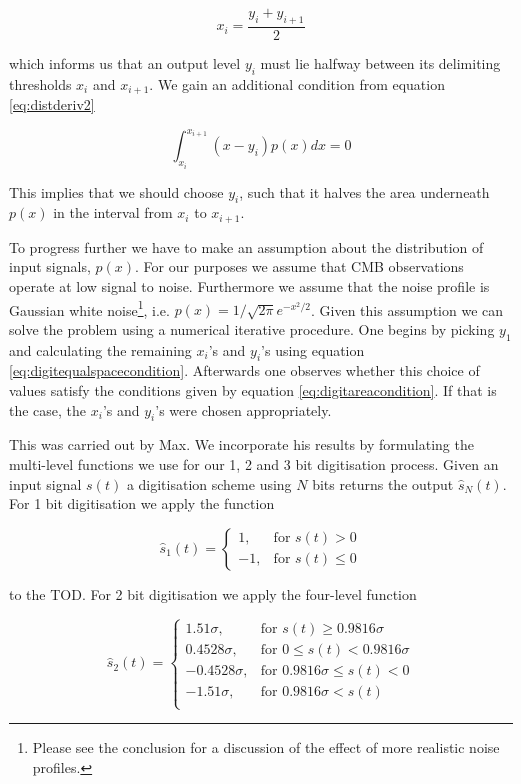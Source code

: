 \documentclass[apj]{emulateapj}
\begin{document}
\begin{equation} \label{eq:digitequalspacecondition}
x_i = \frac{y_i+y_{i+1}}{2}
\end{equation}

which informs us that an output level $y_i$ must lie halfway between its delimiting thresholds $x_i$ and $x_{i+1}$. We gain an additional condition from equation \ref{eq:distderiv2}

\begin{equation} \label{eq:digitareacondition}
\int_{x_i}^{x_{i+1}} \left( x-y_i \right) p(x) dx = 0
\end{equation}

This implies that we should choose $y_i$, such that it halves the area underneath $p(x)$ in the interval from $x_i$ to $x_{i+1}$.

To progress further we have to make an assumption about the distribution of input signals, $p(x)$. For our purposes we assume that CMB observations operate at low signal to noise. Furthermore we assume that the noise profile is Gaussian white noise\footnote{Please see the conclusion for a discussion of the effect of more realistic noise profiles.}, i.e. $p(x) = 1/\sqrt{2\pi} e^{-x^2/2}$. Given this assumption we can solve the problem using a numerical iterative procedure. One begins by picking $y_1$ and calculating the remaining $x_i$'s and $y_i$'s using equation \ref{eq:digitequalspacecondition}. Afterwards one observes whether this choice of values satisfy the conditions given by equation \ref{eq:digitareacondition}. If that is the case, the $x_i$'s and $y_i$'s were chosen appropriately.

This was carried out by Max. We incorporate his results by formulating the multi-level functions we use for our 1, 2 and 3 bit digitisation process. Given an input signal $s(t)$ a digitisation scheme using $N$ bits returns the output $\hat{s}_N(t)$. For 1 bit digitisation we apply the function

\[ \hat{s}_1(t) = \left\{ \begin{array}{lr}
1, & \text{for } s(t) > 0\\
-1, & \text{for } s(t) \leq 0
\end{array} \right. \]

to the TOD. For 2 bit digitisation we apply the four-level function

\[ \hat{s}_2(t) = \left\{ \begin{array}{rl}
1.51 \sigma, & \text{for } s(t) \geq 0.9816 \sigma\\
0.4528 \sigma, & \text{for } 0 \leq s(t) < 0.9816 \sigma\\
-0.4528 \sigma, & \text{for } 0.9816 \sigma \leq s(t) < 0\\
-1.51 \sigma, & \text{for } 0.9816 \sigma < s(t)\\
\end{array} \right. \]
\end{document}
